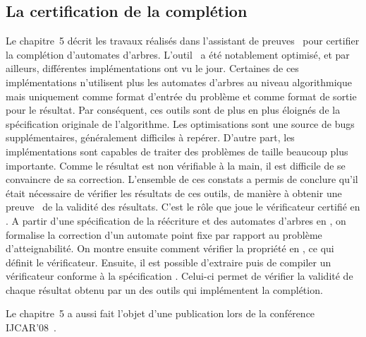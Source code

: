 \subsection*{La certification de la complétion}
Le chapitre~5 décrit les travaux réalisés dans l'assistant de preuves \coq\ pour certifier la
complétion d'automates d'arbres. L'outil \timbuk\ a été notablement optimisé, et par ailleurs, différentes implémentations 
ont vu le jour. Certaines de ces implémentations n'utilisent plus les automates d'arbres au niveau algorithmique mais uniquement
comme format d'entrée du problème et comme format de sortie pour le résultat. %
Par conséquent, ces outils sont de plus en plus éloignés de la spécification originale
de l'algorithme. Les optimisations sont une source de bugs supplémentaires, généralement difficiles à repérer.
D'autre part, les implémentations %
sont capables de traiter des problèmes de taille beaucoup plus importante. Comme le résultat est non vérifiable à la main,
il est difficile de se convaincre de sa correction. L'ensemble de ces constats a permis de conclure qu'il était nécessaire de
vérifier les résultats de ces outils, de manière à obtenir une preuve \coq\ de la validité des résultats. C'est le rôle que joue
le vérificateur certifié en \coq. A partir d'une spécification de la réécriture et des automates d'arbres en \coq, on formalise
la correction d'un automate point fixe par rapport au problème d'atteignabilité. On montre ensuite comment vérifier la propriété
en \coq, ce qui définit le vérificateur. Ensuite, il est possible d'extraire puis de compiler un vérificateur 
conforme à la spécification \coq. Celui-ci permet de vérifier la validité de chaque résultat obtenu par un des outils
qui implémentent la complétion.

Le chapitre~5 a aussi fait l'objet d'une publication lors de la conférence IJCAR'08~\cite{BoyerGJ-IJCAR08}.


